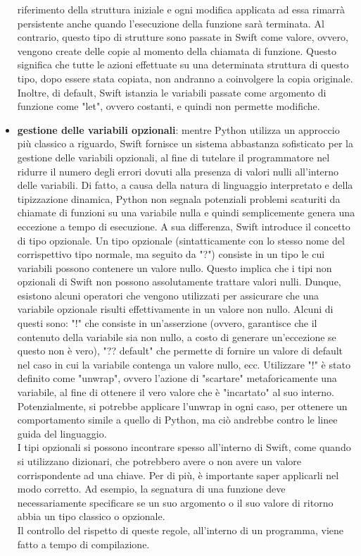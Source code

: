 \begin{itemize}
    riferimento della struttura iniziale e ogni modifica applicata ad
    essa rimarrà persistente anche quando l'esecuzione della funzione sarà 
   	terminata. Al contrario, questo tipo di strutture sono passate in 
   	Swift come valore, ovvero, vengono create delle copie al momento della
   	chiamata di funzione. Questo significa che tutte le azioni effettuate
    su una determinata struttura di questo tipo, dopo essere stata copiata, 
    non andranno a coinvolgere la copia originale. Inoltre, di default, Swift
    istanzia le variabili passate come argomento di funzione come "let",
    ovvero costanti, e quindi non permette modifiche.
    \item \textbf{gestione delle variabili opzionali}: mentre Python utilizza un
    approccio più classico a riguardo, Swift fornisce un sistema
    abbastanza sofisticato per la gestione delle variabili opzionali,
    al fine di tutelare il programmatore nel ridurre il numero degli errori
    dovuti alla presenza di valori nulli all'interno delle variabili.
    Di fatto, a causa della natura di linguaggio interpretato e della
    tipizzazione dinamica, Python non segnala potenziali problemi scaturiti
    da chiamate di funzioni su una variabile nulla e quindi semplicemente 
    genera una eccezione a tempo di esecuzione. A sua differenza, Swift
    introduce il concetto di tipo opzionale. Un tipo opzionale (sintatticamente
    con lo stesso nome del corrispettivo tipo normale, ma seguito da "?") consiste 
    in un tipo le cui variabili possono contenere un valore nullo. Questo implica
    che i tipi non opzionali di Swift non possono assolutamente trattare 
    valori nulli. Dunque, esistono alcuni operatori che vengono utilizzati
    per assicurare che una variabile opzionale risulti effettivamente in un 
    valore non nullo. Alcuni di questi sono: "!" che consiste in un'asserzione
    (ovvero, garantisce che il contenuto della variabile sia non nullo, a costo 
    di generare un'eccezione se questo non è vero), "?? default" che permette
    di fornire un valore di default nel caso in cui la variabile contenga un 
    valore nullo, ecc. Utilizzare "!" è stato definito come "unwrap", ovvero
    l'azione di "scartare" metaforicamente una variabile, al fine di ottenere
    il vero valore che è "incartato" al suo interno. Potenzialmente, si 
    potrebbe applicare l'unwrap in ogni caso, per ottenere un comportamento 
    simile a quello di Python, ma ciò andrebbe contro le linee guida del
    linguaggio. \\
    I tipi opzionali si possono incontrare spesso all'interno di Swift, come 
    quando si utilizzano dizionari, che potrebbero avere o non avere un valore
    corrispondente ad una chiave. Per di più, è importante saper applicarli
    nel modo corretto. Ad esempio, la segnatura di una funzione deve 
    necessariamente specificare se un suo argomento o il suo valore di 
    ritorno abbia un tipo classico o opzionale.\\
    Il controllo del rispetto di queste regole, all'interno di un programma,
    viene fatto a tempo di compilazione.
    
\end{itemize}

